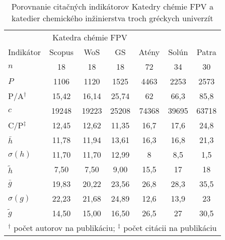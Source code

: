 \begin{SCtable}
\centering\small
  \caption[Porovnanie KCh FPV a kat. chem. inžinierstva  troch gréckych univerzít]%
  {Porovnanie citačných indikátorov Katedry chémie FPV a katedier chemického
    inžinierstva troch gréckych univerzít \citep{Kazakis2015}}
  \label{tab:kazakis.results}
  \begin{tabular}{lcccccc}
    \toprule\noalign{\vspace{.3ex}}
    & \multicolumn{3}{c}{Katedra chémie FPV} & \multicolumn{3}{c}{\citet{Kazakis2015}}  \\
    Indikátor & Scopus & WoS   & GS    &  Atény     & Solún      & Patra      \\[0.3ex]
    \midrule\noalign{\vspace{.5ex}}
    $n$         & 18     & 18    & 18    & 72    & 34    & 30    \\
    $P$         & 1106   & 1120  & 1525  & 4463  & 2253  & 2573  \\
    P/A$^\dagger$         & 15,42  & 16,14 & 25,74 & 62    & 66,3  & 85,8  \\
    $c$         & 19248  & 19223 & 25208 & 74368 & 39695 & 63718 \\
    C/P$^\ddagger$         & 12,45  & 12,62 & 11,35 & 16,7  & 17,6  & 24,8  \\[1ex]
    $\bar{h}$   & 11,78  & 11,94 & 13,61 & 16,3  & 16,8  & 21,3  \\
    $\sigma (h)$ & 11,70  & 11,70 & 12,99 & 8     & 8,5   & 1,5   \\
    $\tilde{h}$ & 7,50   & 7,50  & 9,00  & 15,5  & 17    & 18    \\
    $\bar{g}$   & 19,83  & 20,22 & 23,56 & 26,8  & 28,3  & 35,5  \\
    $\sigma (g)$  & 22,23  & 21,68 & 24,89 & 12,6  & 13,9  & 23    \\
    $\tilde{g}$  & 14,50  & 15,00 & 16,50 & 26,5  & 27    & 30,5  \\[0.5ex]
    \bottomrule
    \multicolumn{7}{l}{\footnotesize $^\dagger$ počet autorov na publikáciu; $^\ddagger$ počet citácii na publikáciu} \\
  \end{tabular}
\end{SCtable}


